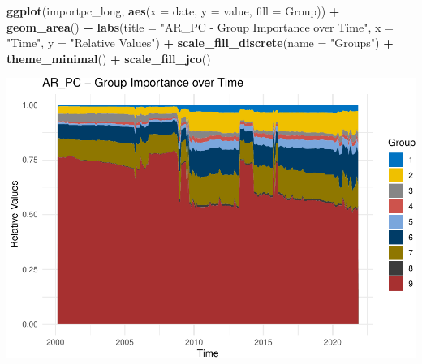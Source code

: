 \documentclass[
]{article}
\newenvironment{Shaded}{\begin{snugshade}}{\end{snugshade}}
\newcommand{\AttributeTok}[1]{\textcolor[rgb]{0.13,0.29,0.53}{#1}}
\newcommand{\FunctionTok}[1]{\textcolor[rgb]{0.13,0.29,0.53}{\textbf{#1}}}
\newcommand{\NormalTok}[1]{#1}
\newcommand{\SpecialCharTok}[1]{\textcolor[rgb]{0.81,0.36,0.00}{\textbf{#1}}}
\newcommand{\StringTok}[1]{\textcolor[rgb]{0.31,0.60,0.02}{#1}}
\begin{document}
\begin{Shaded}
\begin{Highlighting}[]
\FunctionTok{ggplot}\NormalTok{(importpc\_long, }\FunctionTok{aes}\NormalTok{(}\AttributeTok{x =}\NormalTok{ date, }\AttributeTok{y =}\NormalTok{ value, }\AttributeTok{fill =}\NormalTok{ Group)) }\SpecialCharTok{+}
    \FunctionTok{geom\_area}\NormalTok{() }\SpecialCharTok{+} \FunctionTok{labs}\NormalTok{(}\AttributeTok{title =} \StringTok{"AR\_PC {-} Group Importance over Time"}\NormalTok{,}
    \AttributeTok{x =} \StringTok{"Time"}\NormalTok{, }\AttributeTok{y =} \StringTok{"Relative Values"}\NormalTok{) }\SpecialCharTok{+} \FunctionTok{scale\_fill\_discrete}\NormalTok{(}\AttributeTok{name =} \StringTok{"Groups"}\NormalTok{) }\SpecialCharTok{+}
    \FunctionTok{theme\_minimal}\NormalTok{() }\SpecialCharTok{+} \FunctionTok{scale\_fill\_jco}\NormalTok{()}
\end{Highlighting}
\end{Shaded}

\includegraphics{Trabalho_Econo4_Q2_files/figure-latex/unnamed-chunk-36-1.pdf}
\end{document}

